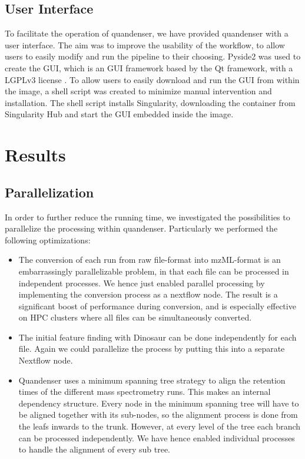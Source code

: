 \documentclass[11pt]{article}
\begin{document}

\subsection*{User Interface}
To facilitate the operation of quandenser, we have provided quandenser with a user interface. The aim was to improve the usability of the workflow, to allow users to easily modify and run the pipeline to their choosing. Pyside2 was used to create the GUI, which is an GUI framework based by the Qt framework, with a LGPLv3 license \cite{pyside2}. To allow users to easily download and run the GUI from within the image, a shell script was created to minimize manual intervention and installation. The shell script installs Singularity, downloading the container from Singularity Hub and start the GUI embedded inside the image.

\section*{Results}

\subsection*{Parallelization}
In order to further reduce the running time, we investigated the possibilities to parallelize the processing within quandenser. Particularly we performed the following optimizations:
\begin{itemize}
  \item The conversion of each run from raw file-format into mzML-format is an embarrassingly parallelizable problem, in that each file can be processed in independent processes. We hence just enabled parallel processing by implementing the conversion process as a nextflow node. The result is a significant boost of performance during conversion, and is especially effective on HPC clusters where all files can be simultaneously converted.
  \item The initial feature finding with Dinosaur\cite{teleman2016dinosaur} can be done independently for each file. Again we could parallelize the process by putting this into a separate Nextflow node.
  \item Quandenser uses a minimum spanning tree strategy \cite{rost2016tric} to align the retention times of the different mass spectrometry runs. This makes an internal dependency structure. Every node in the minimum spanning tree will have to be aligned together with its sub-nodes, so the alignment process is done from the leafs inwards to the trunk.  However, at every level of the tree each branch can be processed independently. We have hence enabled individual processes to handle the alignment of every sub tree.
\end{itemize}
\end{document}
